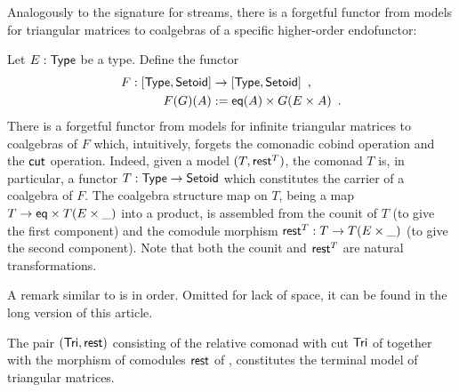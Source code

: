\documentclass[a4paper,USenglish]{lipics}
\begin{document}
Analogously to the signature for streams, there is a forgetful functor from models for triangular matrices to coalgebras of a specific higher-order
endofunctor:

\begin{rem}
\begin{Long}
  Let $E : \mathsf{Type}$ be a type. Define the functor
  \begin{align*}  F: [\mathsf{Type},\mathsf{Setoid}] &\to [\mathsf{Type},\mathsf{Setoid}]  \enspace ,\\
                      F(G)(A) &:= \mathsf{eq}(A) \times G(E \times A) \enspace .
  \end{align*}
  There is a forgetful functor from models for infinite triangular matrices to coalgebras of $F$ which, intuitively, forgets the comonadic cobind operation and the $\mathsf{cut}$ operation.
  Indeed, given a model $(T,\mathsf{rest}^T)$, the comonad $T$ is, in particular, a functor $T:\mathsf{Type}\to\mathsf{Setoid}$ which constitutes the carrier of 
  a coalgebra of $F$. The coalgebra structure map on $T$, being a map $T \to \mathsf{eq} \times T(E\times \_ )$ into a product, 
  is assembled from the counit of $T$ (to give the first component) 
  and the comodule morphism $\mathsf{rest}^T : T \to T(E\times \_)$ (to give the second component).
  Note that both the counit and $\mathsf{rest}^T$ are natural transformations.
\end{Long}
\begin{Short}
 A remark similar to  is in order. Omitted for lack of space, it can be found in the long
 version of this article.
\end{Short}
\end{rem}


   

\begin{thm}\label{ex:final_sem_tri} 
   The pair $(\mathsf{Tri}, \mathsf{rest})$ consisting of the relative comonad with cut $\mathsf{Tri}$ of  together with 
    the morphism of comodules $\mathsf{rest}$ of ,
   constitutes the terminal model of triangular matrices.
\end{thm}
\end{document}
